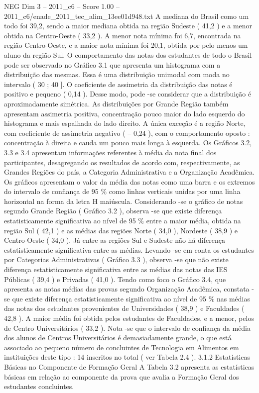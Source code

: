 \begin{textsample}{NEG Dim 3 – 2011\_c6 – Score 1.00 – 2011\_c6/enade\_2011\_tec\_alim\_13ee01d948.txt}
A mediana do Brasil como um todo foi 39,2, sendo a maior mediana obtida na região Sudeste ( 41,2 ) e a menor obtida na Centro-Oeste ( 33,2 ).
A menor nota mínima foi 6,7, encontrada na região Centro-Oeste, e a maior nota mínima foi 20,1, obtida por pelo menos um aluno da região Sul.
O comportamento das notas dos estudantes de todo o Brasil pode ser observado no Gráfico 3.1 que apresenta um histograma com a distribuição das mesmas.
Essa é uma distribuição unimodal com moda no intervalo ( 30 ; 40 ].
O coeficiente de assimetria da distribuição das notas é positivo e pequeno ( 0,14 ).
Desse modo, pode -se considerar que a distribuição é aproximadamente simétrica.
As distribuições por Grande Região também apresentam assimetria positiva, concentração pouco maior do lado esquerdo do histograma e mais espalhada do lado direito.
A única exceção é a região Norte, com coeficiente de assimetria negativo ( – 0,24 ), com o comportamento oposto : concentração à direita e cauda um pouco mais longa à esquerda.
Os Gráficos 3.2, 3.3 e 3.4 apresentam informações referentes à média da nota final dos participantes, desagregando os resultados de acordo com, respectivamente, as Grandes Regiões do país, a Categoria Administrativa e a Organização Acadêmica.
Os gráficos apresentam o valor da média das notas como uma barra e os extremos do intervalo de confiança de 95 \% como linhas verticais unidas por uma linha horizontal na forma da letra H maiúscula.
Considerando -se o gráfico de notas segundo Grande Região ( Gráfico 3.2 ), observa -se que existe diferença estatisticamente significativa ao nível de 95 \% entre a maior média, obtida na região Sul ( 42,1 ) e as médias das regiões Norte ( 34,0 ), Nordeste ( 38,9 ) e Centro-Oeste ( 34,0 ).
Já entre as regiões Sul e Sudeste não há diferença estatisticamente significativa entre as médias.
Levando -se em conta os estudantes por Categorias Administrativas ( Gráfico 3.3 ), observa -se que não existe diferença estatisticamente significativa entre as médias das notas das IES Públicas ( 39,4 ) e Privadas ( 41,0 ).
Tendo como foco o Gráfico 3.4, que apresenta as notas médias das provas segundo Organização Acadêmica, constata -se que existe diferença estatisticamente significativa ao nível de 95 \% nas médias das notas dos estudantes provenientes de Universidades ( 38,9 ) e Faculdades ( 42,8 ).
A maior média foi obtida pelos estudantes de Faculdades, e a menor, pelos de Centro Universitários ( 33,2 ).
Nota -se que o intervalo de confiança da média dos alunos de Centros Universitários é demasiadamente grande, o que está associado ao pequeno número de concluintes de Tecnologia em Alimentos em instituições deste tipo : 14 inscritos no total ( ver Tabela 2.4 ). 3.1.2 Estatísticas Básicas no Componente de Formação Geral A Tabela 3.2 apresenta as estatísticas básicas em relação ao componente da prova que avalia a Formação Geral dos estudantes concluintes.

\end{textsample}
